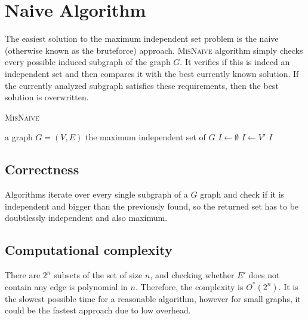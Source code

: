 \section{Naive Algorithm}

The easiest solution to the maximum independent set problem is the naive (otherwise known as the bruteforce) approach. \textsc{MisNaive} algorithm simply checks every possible induced subgraph of the graph $G$. It verifies if this is indeed an independent set and then compares it with the best currently known solution. If the currently analyzed subgraph satisfies these requirements, then the best solution is overwritten.

\begin{algorithm}
\caption{\textsc{MisNaive}}\label{bruteforce}
\begin{algorithmic}[1]
\Require a graph $G=(V,E)$
\Ensure the maximum independent set of $G$
    \State $I \gets \emptyset$
            \State $I \gets V'$            
        \EndIf
    \EndFor
    \State \Return $I$
\EndProcedure
\end{algorithmic}
\end{algorithm}

\subsection{Correctness}

Algorithms iterate over every single subgraph of a $G$ graph and check if it is independent and bigger than the previously found, so the returned set has to be doubtlessly independent and also maximum.

\subsection{Computational complexity}

There are $2^n$ subsets of the set of size $n$, and checking whether $E'$ does not contain any edge is polynomial in $n$. Therefore, the complexity is $O^*(2^n)$. It is the slowest possible time for a reasonable algorithm, however for small graphs, it could be the fastest approach due to low overhead.